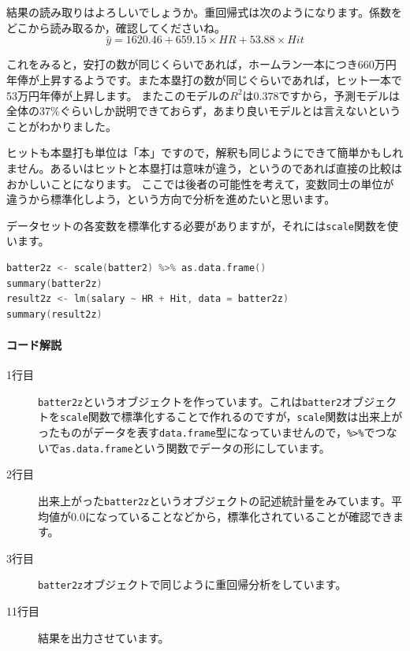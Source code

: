 \documentclass{ltjbook}
\begin{document}
結果の読み取りはよろしいでしょうか。重回帰式は次のようになります。係数をどこから読み取るか，確認してくださいね。
\[ \hat{y} = 1620.46 + 659.15 \times HR + 53.88 \times Hit \]

これをみると，安打の数が同じくらいであれば，ホームラン一本につき660万円年俸が上昇するようです。また本塁打の数が同じぐらいであれば，ヒット一本で53万円年俸が上昇します。
またこのモデルの$R^2$は$0.378$ですから，予測モデルは全体の37\%ぐらいしか説明できておらず，あまり良いモデルとは言えないということがわかりました。

ヒットも本塁打も単位は「本」ですので，解釈も同じようにできて簡単かもしれません。あるいはヒットと本塁打は意味が違う，というのであれば直接の比較はおかしいことになります。
ここでは後者の可能性を考えて，変数同士の単位が違うから標準化しよう，という方向で分析を進めたいと思います。

データセットの各変数を標準化する必要がありますが，それには\texttt{scale}関数を使います。

\begin{lstlisting}[language=c++,label={code::11_08},caption={標準化したデータで重回帰分析を実行}]
batter2z <- scale(batter2) %>% as.data.frame()
summary(batter2z)
result2z <- lm(salary ~ HR + Hit, data = batter2z)
summary(result2z)
\end{lstlisting}


\paragraph{コード解説}
\begin{description}
    \item[1行目]\texttt{batter2z}というオブジェクトを作っています。これは\texttt{batter2}オブジェクトを\verb|scale|関数で標準化することで作れるのですが，\verb|scale|関数は出来上がったものがデータを表す\texttt{data.frame}型になっていませんので，\verb|%>%|でつないで\verb|as.data.frame|という関数でデータの形にしています。
    \item[2行目] 出来上がった\texttt{batter2z}というオブジェクトの記述統計量をみています。平均値が0.0になっていることなどから，標準化されていることが確認できます。
    \item[3行目]  \texttt{batter2z}オブジェクトで同じように重回帰分析をしています。
    \item[11行目] 結果を出力させています。
\end{description}
\end{document}
